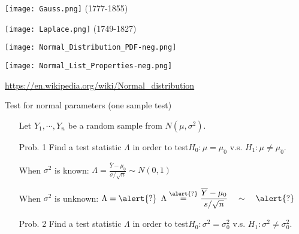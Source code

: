 \begin{frame}
	\centering
		\begin{minipage}{0.4\textwidth}
\centering
		\texttt{[image: Gauss.png]}
		(1777-1855)
\end{minipage}
		\qquad
		\begin{minipage}{0.4\textwidth}
\centering
		\texttt{[image: Laplace.png]}
		(1749-1827)
\end{minipage}
\end{frame}
\begin{frame}
	\centering
	\begin{minipage}{0.28\textwidth}
		\centering
	\texttt{[image: Normal\_Distribution\_PDF-neg.png]}
\end{minipage}
\hfill
\begin{minipage}{0.63\textwidth}
	\centering
	\texttt{[image: Normal\_List\_Properties-neg.png]}
\end{minipage}
\vfill
\footnotesize
\url{https://en.wikipedia.org/wiki/Normal_distribution}
\end{frame}
\begin{frame}{Test for normal parameters (one sample test)}
\begin{enumerate}
	\item[Let] $Y_1,\cdots,Y_n$ be a random sample from $N(\mu,\sigma^2)$.
		\vfill
	\item[Prob. 1] Find a test statistic $\Lambda$ in order to test\hfill $H_0 : \mu = \mu_0$ v.s. $H_1 : \mu \ne \mu_0$. \\[2em]
	\item[]When $\sigma^2$ is known: \hspace{4em}
		$\displaystyle	\Lambda =  \frac{\overline{Y}-\mu_0}{\sigma/\sqrt{n}}\sim N(0,1)$\\[1em]
\item[] When $\sigma^2$ is unknown: \hspace{3em} $\displaystyle \Lambda = \alert{?}$
	\pause \hspace{3em}
	$\displaystyle	\Lambda \stackrel{\alert{?}}{=}  \frac{\overline{Y}-\mu_0}{s/\sqrt{n}}\quad \sim\quad \alert{?}$
	\vfill
	\item[Prob. 2] Find a test statistic $\Lambda$ in order to test\hfill $H_0 : \sigma^2 = \sigma_0^2$ v.s. $H_1 : \sigma^2 \ne \sigma^2_0$. \\[2em]
\end{enumerate}
\end{frame}
